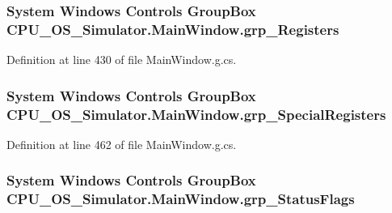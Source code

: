 \subsubsection[{grp\+\_\+\+Registers}]{\setlength{\rightskip}{0pt plus 5cm}System Windows Controls Group\+Box C\+P\+U\+\_\+\+O\+S\+\_\+\+Simulator.\+Main\+Window.\+grp\+\_\+\+Registers\hspace{0.3cm}{\ttfamily [package]}}\label{class_c_p_u___o_s___simulator_1_1_main_window_af858add509dfe2b90f0d356822f73737}


Definition at line 430 of file Main\+Window.\+g.\+cs.

\hypertarget{class_c_p_u___o_s___simulator_1_1_main_window_a02e4a81d8689928cb1d459fd3c01bfdf}{}
\subsubsection[{grp\+\_\+\+Special\+Registers}]{\setlength{\rightskip}{0pt plus 5cm}System Windows Controls Group\+Box C\+P\+U\+\_\+\+O\+S\+\_\+\+Simulator.\+Main\+Window.\+grp\+\_\+\+Special\+Registers\hspace{0.3cm}{\ttfamily [package]}}\label{class_c_p_u___o_s___simulator_1_1_main_window_a02e4a81d8689928cb1d459fd3c01bfdf}


Definition at line 462 of file Main\+Window.\+g.\+cs.

\hypertarget{class_c_p_u___o_s___simulator_1_1_main_window_a9947d1946c8258ea1fb77d860baa7e0f}{}
\subsubsection[{grp\+\_\+\+Status\+Flags}]{\setlength{\rightskip}{0pt plus 5cm}System Windows Controls Group\+Box C\+P\+U\+\_\+\+O\+S\+\_\+\+Simulator.\+Main\+Window.\+grp\+\_\+\+Status\+Flags\hspace{0.3cm}{\ttfamily [package]}}\label{class_c_p_u___o_s___simulator_1_1_main_window_a9947d1946c8258ea1fb77d860baa7e0f}


